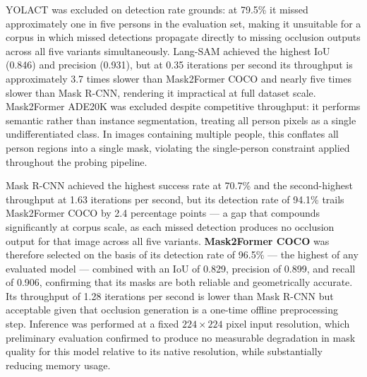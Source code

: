 YOLACT was excluded on detection rate grounds: at 79.5\% it 
missed approximately one in five persons in the evaluation set, 
making it unsuitable for a corpus in which missed detections 
propagate directly to missing occlusion outputs across all five 
variants simultaneously. Lang-SAM achieved the highest IoU 
(0.846) and precision (0.931), but at 0.35 iterations per 
second its throughput is approximately 3.7 times slower than 
Mask2Former COCO and nearly five times slower than Mask R-CNN, 
rendering it impractical at full dataset scale. Mask2Former 
ADE20K was excluded despite competitive throughput: it performs 
semantic rather than instance segmentation, treating all person 
pixels as a single undifferentiated class. In images containing 
multiple people, this conflates all person regions into a single 
mask, violating the single-person constraint applied throughout 
the probing pipeline.

Mask R-CNN achieved the highest success rate at 70.7\% and the 
second-highest throughput at 1.63 iterations per second, but 
its detection rate of 94.1\% trails Mask2Former COCO by 2.4 
percentage points --- a gap that compounds significantly at 
corpus scale, as each missed detection produces no occlusion 
output for that image across all five variants. 
\textbf{Mask2Former COCO} was therefore selected on the basis 
of its detection rate of 96.5\% --- the highest of any 
evaluated model --- combined with an IoU of 0.829, precision 
of 0.899, and recall of 0.906, confirming that its masks are 
both reliable and geometrically accurate. Its throughput of 
1.28 iterations per second is lower than Mask R-CNN but 
acceptable given that occlusion generation is a one-time 
offline preprocessing step. Inference was performed at a fixed 
$224 \times 224$ pixel input resolution, which preliminary 
evaluation confirmed to produce no measurable degradation in 
mask quality for this model relative to its native resolution, 
while substantially reducing memory usage.

